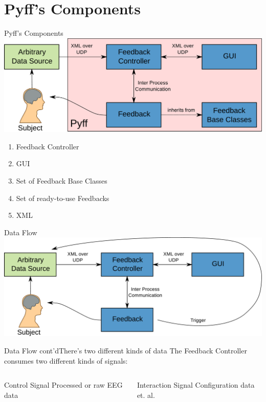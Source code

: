 \documentclass{beamer}
\begin{document}
\section{Pyff's Components}
\begin{frame}{Pyff's Components}
    \includegraphics[width=\linewidth]{pyff_overview}
    \vfill
    \begin{enumerate}
        \item Feedback Controller
        \item GUI
        \item Set of Feedback Base Classes
        \item Set of ready-to-use Feedbacks
        \item XML
    \end{enumerate}
\end{frame}

\begin{frame}{Data Flow}
    \includegraphics[width=\linewidth]{pyff_data_flow}
\end{frame}

\begin{frame}{Data Flow cont'd}{There's two different kinds of data}
    The Feedback Controller consumes two different kinds of signals:
    \begin{columns}
            \begin{block}{Control Signal}
                Processed or raw EEG data
            \end{block}
            \begin{block}{Interaction Signal}
                Configuration data et. al.
            \end{block}
    \end{columns}
\end{frame}
\end{document}
